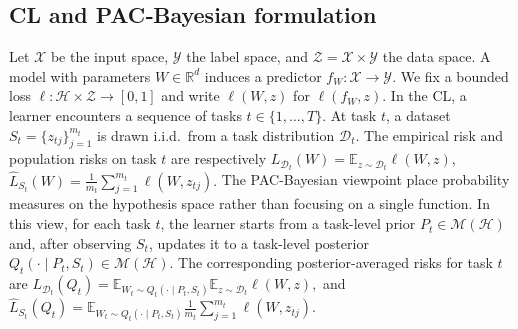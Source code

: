 \documentclass{article}
\theoremstyle{plain}
\theoremstyle{definition}
\theoremstyle{remark}
\begin{document}
\subsection{CL and PAC‑Bayesian formulation}
\label{sec:pecl-setup}

Let $\mathcal X$ be the input space, $\mathcal Y$ the label space, and $\mathcal Z = \mathcal X \times \mathcal Y$ the data space.
A model with parameters $W \in \mathbb R^d$ induces a predictor $f_W : \mathcal X \to \mathcal Y$.
We fix a bounded loss $\ell : \mathcal H \times \mathcal Z \to [0,1]$ and write $\ell(W,z)$ for $\ell(f_W,z)$.
In the CL, a learner encounters a sequence of tasks $t\in\{1,\dots,T\}$. 
At task $t$, a dataset
$
S_t = \{z_{tj}\}_{j=1}^{m_t}
$
is drawn i.i.d.\ from a task distribution $\mathcal D_t$.
The empirical risk and population risks on task $t$ are respectively
$
L_{\mathcal D_t}(W)
=
\mathbb E_{z\sim\mathcal D_t}\ell(W,z),
$
$
\hat L_{S_t}(W)
=
\frac{1}{m_t}\sum_{j=1}^{m_t}\ell(W,z_{tj}).
$ 
The PAC-Bayesian viewpoint place probability measures on the hypothesis space rather than focusing on a single function. In this view, for each task $t$, the learner starts from a task-level prior $P_t\in\mathcal M(\mathcal H)$ and, after observing $S_t$, updates it to a task-level posterior $Q_t(\cdot\mid P_t,S_t)\in\mathcal M(\mathcal H)$.
The corresponding posterior-averaged risks for task $t$ are
$
L_{\mathcal D_t}(Q_t)
=
\mathbb E_{W_t \sim Q_t(\cdot \mid P_t,S_t)}\mathbb E_{z\sim\mathcal D_t}\ell(W,z),
$ and $
\hat L_{S_t}(Q_t)
=
\mathbb E_{W_t \sim Q_t(\cdot \mid P_t,S_t)}\frac{1}{m_t}\sum_{j=1}^{m_t}\ell(W,z_{tj}).
$
\end{document}
